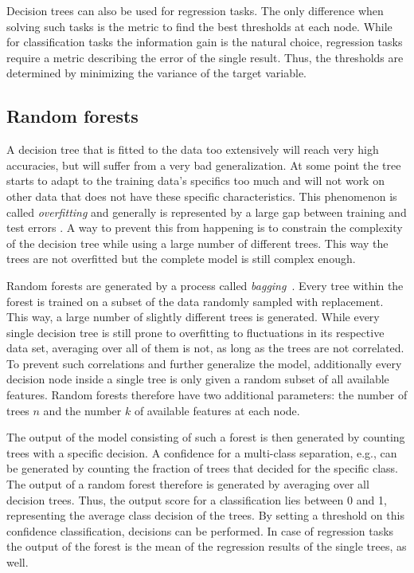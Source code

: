 Decision trees can also be used for regression tasks. The only difference when
solving such tasks is the metric to find the best thresholds at each node.
While for classification tasks the information gain is the natural choice, regression
tasks require a metric describing the error of the single result. Thus, the
thresholds are determined by minimizing the variance of the target variable.

\subsection{Random forests}
%
A decision tree that is fitted to the data too extensively will reach
very high accuracies, but will suffer from a very bad generalization. At some
point the tree starts to adapt to the training data's specifics too much and
will not work on other data that does not have these specific characteristics.
This phenomenon is called \textit{overfitting} and generally is represented by
a large gap between training and test errors \cite{goodfellow}. A way to
prevent this from happening is to constrain the complexity of the decision tree
while using a large number of different trees. This way the trees are not
overfitted but the complete model is still complex enough.

Random forests are generated by a process called
\textit{bagging}~\cite{bagging}. Every tree within the forest is trained on a
subset of the data randomly sampled with replacement. This way, a large number
of slightly different trees is generated. While every single decision tree is
still prone to overfitting to fluctuations in its respective data set, averaging over
all of them is not, as long as the trees are not correlated. To prevent such
correlations and further generalize the model, additionally every decision node
inside a single tree is only given a random subset of all available features.
Random forests therefore have two additional parameters: the number of trees
$n$ and the number $k$ of available features at each node.

The output of the model consisting of such a forest is then generated
by counting trees with a specific decision. A confidence for a multi-class
separation, e.g., can be generated by counting the fraction of trees that
decided for the specific class. The output of a random forest therefore is generated by averaging over all decision trees. Thus, the output score for a classification lies between \num{0} and \num{1}, representing the average class decision of the trees. By setting a threshold on this confidence
classification, decisions can be performed. In case of regression tasks the
output of the forest is the mean of the regression results of the single trees,
as well.

